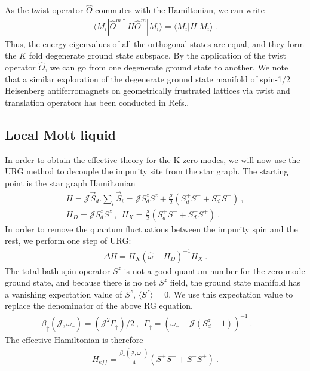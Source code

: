 \documentclass{iopart}
\begin{document}
As the twist operator $\hat{O}$ commutes with the Hamiltonian, we can write
\begin{eqnarray}
\langle M_i| \hat{O}^{m \dagger}  H \hat{O}^m |M_i\rangle =\langle M_i|  H |M_i\rangle ~.
\end{eqnarray}
Thus, the energy eigenvalues of all the orthogonal states are equal, and they form the $K$ fold degenerate ground state subspace. By the application of the twist operator $\hat{O}$, we can go from one degenerate ground state to another. We note that a similar exploration of the degenerate ground state manifold of spin-1/2 Heisenberg antiferromagnets on geometrically frustrated lattices via twist and translation operators has been conducted in Refs.\cite{pal2019magnetization,pal2020topological}. 

\subsection{Local Mott liquid}
\label{sec:loc_mott_liquid}
In order to obtain the effective theory for the K zero modes, we will now use the URG method to decouple the impurity site from the star graph. The starting point is the star graph Hamiltonian
\begin{eqnarray}
H = {\mathcal{J}} \vec{S}_d.\displaystyle\sum_i \vec{S}_i ={\mathcal{J}} S_d^zS^z + \frac{{\mathcal{J}}}{2} (S_d^+S^-+ S_d^-S^+) ~,\nonumber\\
H_D = {\mathcal{J}} S^z_d S^z~,~~ H_X = \frac{{\mathcal{J}}}{2} (S_d^+S^-+ S_d^-S^+)~.
\end{eqnarray}
In order to remove the quantum fluctuations between the impurity spin and the rest, we perform one step of URG:
\begin{eqnarray}
\Delta H = H_X ({\hat{\omega}-H_D})^{-1} H_X ~.
\end{eqnarray}
The total bath spin operator \(S^z\) is not a good quantum number for the zero mode ground state, and because there is no net $S^z$ field, the ground state manifold has a vanishing expectation value of $S^z$, $\langle S^z \rangle=0$. We use this expectation value to replace the denominator of the above RG equation.
\begin{eqnarray}
\beta_{\uparrow} ({\mathcal{J}},\omega_{\uparrow}) = ({\mathcal{J}}^2 \Gamma_{\uparrow})/2 ~,~~\Gamma_{\uparrow}=(\omega_{\uparrow}-{\mathcal{J}}(S_d^z-1))^{-1}~.\qquad
\end{eqnarray}
The effective Hamiltonian is therefore
\begin{eqnarray}
H_{eff} 
 =\frac{\beta_{\uparrow}({\mathcal{J}},\omega_{\uparrow})}{4} (S^+S^-+S^-S^+)   ~.
\end{eqnarray}
\end{document}
